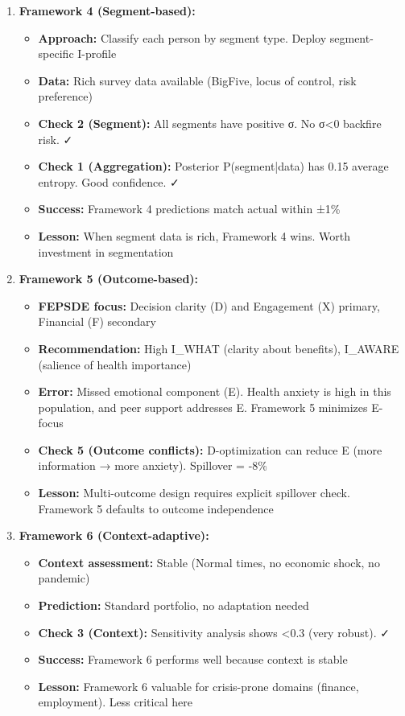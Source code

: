 \begin{enumerate}
\item \textbf{Framework 4 (Segment-based):}
  \begin{itemize}[nosep]
  \item \textbf{Approach:} Classify each person by segment type. Deploy segment-specific I-profile
  \item \textbf{Data:} Rich survey data available (BigFive, locus of control, risk preference)
  \item \textbf{Check 2 (Segment):} All segments have positive σ. No σ<0 backfire risk. ✓
  \item \textbf{Check 1 (Aggregation):} Posterior P(segment|data) has 0.15 average entropy. Good confidence. ✓
  \item \textbf{Success:} Framework 4 predictions match actual within ±1\%
  \item \textbf{Lesson:} When segment data is rich, Framework 4 wins. Worth investment in segmentation
  \end{itemize}

\item \textbf{Framework 5 (Outcome-based):}
  \begin{itemize}[nosep]
  \item \textbf{FEPSDE focus:} Decision clarity (D) and Engagement (X) primary, Financial (F) secondary
  \item \textbf{Recommendation:} High I\_WHAT (clarity about benefits), I\_AWARE (salience of health importance)
  \item \textbf{Error:} Missed emotional component (E). Health anxiety is high in this population, and peer support addresses E. Framework 5 minimizes E-focus
  \item \textbf{Check 5 (Outcome conflicts):} D-optimization can reduce E (more information → more anxiety). Spillover = -8\%
  \item \textbf{Lesson:} Multi-outcome design requires explicit spillover check. Framework 5 defaults to outcome independence
  \end{itemize}

\item \textbf{Framework 6 (Context-adaptive):}
  \begin{itemize}[nosep]
  \item \textbf{Context assessment:} Stable (Normal times, no economic shock, no pandemic)
  \item \textbf{Prediction:} Standard portfolio, no adaptation needed
  \item \textbf{Check 3 (Context):} Sensitivity analysis shows <0.3 (very robust). ✓
  \item \textbf{Success:} Framework 6 performs well because context is stable
  \item \textbf{Lesson:} Framework 6 valuable for crisis-prone domains (finance, employment). Less critical here
  \end{itemize}

\end{enumerate}

